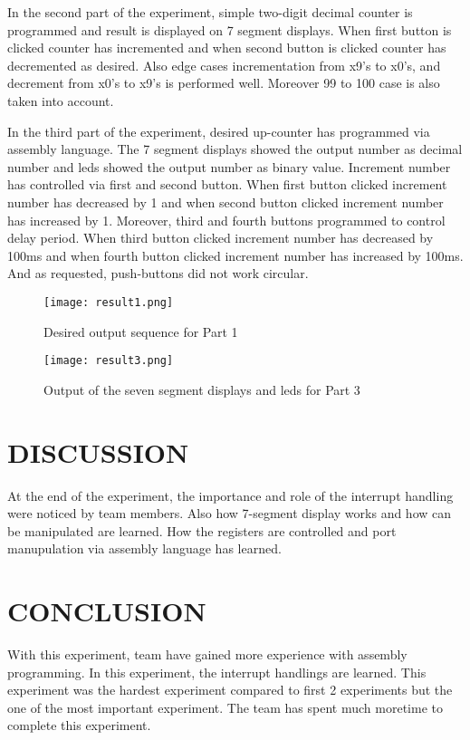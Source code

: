 \documentclass[pdftex,12pt,a4paper]{article}
\begin{document}
In the second part of the experiment, simple two-digit decimal counter is programmed and result is displayed on 7 segment displays. When first button is clicked counter has incremented and when second button is clicked counter has decremented as desired. Also edge cases incrementation from x9's to x0's, and decrement from x0's to x9's is performed well. Moreover 99 to 100 case is also taken into account.

In the third part of the experiment, desired up-counter has programmed via assembly language. The 7 segment displays showed the output number as decimal number and leds showed the output number as binary value. Increment number has controlled via first and second button. When first button clicked increment number has decreased by 1 and when second button clicked increment number has increased by 1. Moreover, third and fourth buttons programmed to control delay period. When third button clicked increment number has decreased by 100ms and when fourth button clicked increment number has increased by 100ms. And as requested, push-buttons did not work circular.\\

\begin{figure}[ht]
	\centering
	\texttt{[image: result1.png]}	
	\caption{Desired output sequence for Part 1}
	\label{fig1}
\end{figure}


\begin{figure}[ht]
	\centering
	\texttt{[image: result3.png]}	
	\caption{Output of the seven segment displays and leds for Part 3}
	\label{fig1}
\end{figure}


\clearpage
\section{DISCUSSION}
At the end of the experiment, the importance and role of the interrupt handling were noticed by team members. Also how 7-segment display works and how can be manipulated are learned. How the registers are controlled and port manupulation via assembly language has learned.

\section{CONCLUSION}
With this experiment, team have gained more experience with assembly programming. In this experiment, the interrupt handlings are learned. This experiment was the hardest experiment compared to first 2 experiments but the one of the most important experiment. The team has spent much moretime to complete this experiment.
\end{document}
